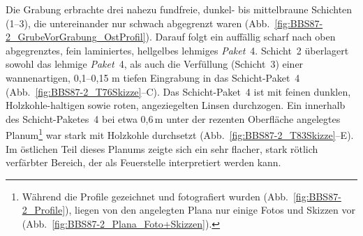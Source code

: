 Die Grabung erbrachte drei nahezu fundfreie, dunkel- bis mittelbraune Schichten (1--3), die untereinander nur schwach abgegrenzt waren (Abb.~\ref{fig:BBS87-2_GrubeVorGrabung_OstProfil}). Darauf folgt ein auffällig scharf nach oben abgegrenztes, fein laminiertes, hellgelbes lehmiges \textit{Paket}~4. Schicht~2 überlagert sowohl das lehmige \textit{Paket}~4, als auch die Verfüllung (Schicht~3) einer wannenartigen, 0,1--0,15 m tiefen Eingrabung in das Schicht-Paket~4 (Abb.~\ref{fig:BBS87-2_T76Skizze}--C). Das Schicht-Paket~4 ist mit feinen dunklen, Holzkohle-haltigen sowie roten, angeziegelten Linsen durchzogen. Ein innerhalb des Schicht-Paketes~4 bei etwa 0,6\,m unter der rezenten Oberfläche angelegtes Planum\footnote{Während die Profile gezeichnet und fotografiert wurden (Abb.~\ref{fig:BBS87-2_Profile}), liegen von den angelegten Plana nur einige Fotos und Skizzen vor (Abb.~\ref{fig:BBS87-2_Plana_Foto+Skizzen}).} war stark mit Holzkohle durchsetzt (Abb.~\ref{fig:BBS87-2_T83Skizze}--E). Im östlichen Teil dieses Planums zeigte sich ein sehr flacher, stark rötlich verfärbter Bereich, der als Feuerstelle interpretiert werden kann. 

